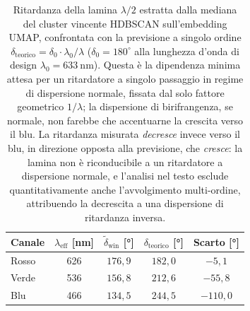 \begin{table}[H]
    \centering
    \caption{Ritardanza della lamina $\lambda/2$ estratta dalla mediana del cluster vincente HDBSCAN sull'embedding UMAP, confrontata con la previsione a singolo ordine $\delta_\mathrm{teorico} = \delta_0 \cdot \lambda_0/\lambda$ ($\delta_0 = 180^\circ$ alla lunghezza d'onda di design $\lambda_0 = \SI{633}{\nano\meter}$). Questa è la dipendenza minima attesa per un ritardatore a singolo passaggio in regime di dispersione normale, fissata dal solo fattore geometrico $1/\lambda$; la dispersione di birifrangenza, se normale, non farebbe che accentuarne la crescita verso il blu. La ritardanza misurata \emph{decresce} invece verso il blu, in direzione opposta alla previsione, che \emph{cresce}: la lamina non è riconducibile a un ritardatore a dispersione normale, e l'analisi nel testo esclude quantitativamente anche l'avvolgimento multi-ordine, attribuendo la decrescita a una dispersione di ritardanza inversa.}
    \label{tab:hw_ritardanza}
    \begin{tabular}{lcccc}
        \hline
        \textbf{Canale} & $\lambda_\mathrm{eff}$ [\si{\nano\meter}] & $\tilde\delta_\mathrm{win}$ [\si{\degree}] & $\delta_\mathrm{teorico}$ [\si{\degree}] & Scarto [\si{\degree}] \\
        \hline
        Rosso & 626 & $176{,}9$ & $182{,}0$ & $-5{,}1$ \\
        Verde & 536 & $156{,}8$ & $212{,}6$ & $-55{,}8$ \\
        Blu   & 466 & $134{,}5$ & $244{,}5$ & $-110{,}0$ \\
        \hline
    \end{tabular}
\end{table}

